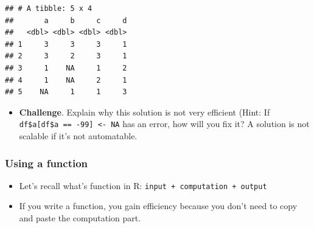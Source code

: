 \documentclass[
]{book}
\newenvironment{Shaded}{\begin{snugshade}}{\end{snugshade}}
\newcommand{\CommentTok}[1]{\textcolor[rgb]{0.56,0.35,0.01}{\textit{#1}}}
\newcommand{\ConstantTok}[1]{\textcolor[rgb]{0.56,0.35,0.01}{#1}}
\newcommand{\DecValTok}[1]{\textcolor[rgb]{0.00,0.00,0.81}{#1}}
\newcommand{\NormalTok}[1]{#1}
\newcommand{\OtherTok}[1]{\textcolor[rgb]{0.56,0.35,0.01}{#1}}
\newcommand{\SpecialCharTok}[1]{\textcolor[rgb]{0.81,0.36,0.00}{\textbf{#1}}}
\providecommand{\tightlist}{%
  \setlength{\itemsep}{0pt}\setlength{\parskip}{0pt}}
\begin{document}
\begin{Shaded}
\end{Shaded}

\begin{verbatim}
## # A tibble: 5 x 4
##       a     b     c     d
##   <dbl> <dbl> <dbl> <dbl>
## 1     3     3     3     1
## 2     3     2     3     1
## 3     1    NA     1     2
## 4     1    NA     2     1
## 5    NA     1     1     3
\end{verbatim}

\begin{itemize}
\tightlist
\item
  \textbf{Challenge}. Explain why this solution is not very efficient (Hint: If \texttt{df\$a{[}df\$a\ ==\ -99{]}\ \textless{}-\ NA} has an error, how will you fix it? A solution is not scalable if it's not automatable.
\end{itemize}

\subsubsection{Using a function}\label{using-a-function}

\begin{itemize}
\item
  Let's recall what's function in R: \texttt{input\ +\ computation\ +\ output}
\item
  If you write a function, you gain efficiency because you don't need to copy and paste the computation part.
\end{itemize}
\end{document}

